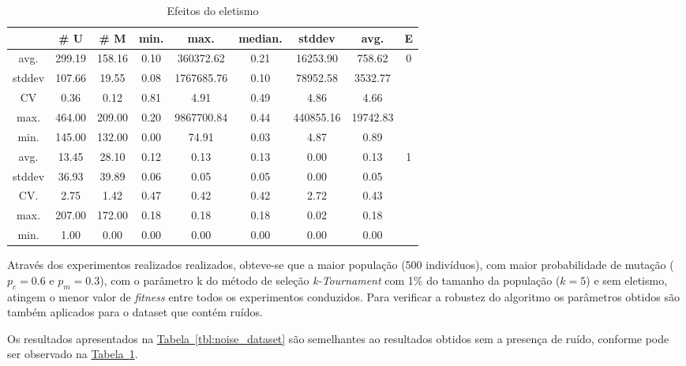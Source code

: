 \documentclass[a4paper]{paper}
\begin{document}
\begin{table}
  \center
  \caption{Efeitos do eletismo}
  \label{tbl:var_eletism}
  \begin{tabular}{| c | c | c | c | c | c | c | c | c |}
    \hline
    &  \# U & \# M & min. & max. & median. & stddev & avg. & E \\ \hline \hline
avg. & 299.19 & 158.16 & 0.10 & 360372.62 & 0.21 & 16253.90 & 758.62 & \multirow{5}{1.5cm}{0} \\ \cline{1-8}
stddev & 107.66 & 19.55 & 0.08 & 1767685.76 & 0.10 & 78952.58 & 3532.77 & \\ \cline{1-8}
CV & 0.36 & 0.12 & 0.81 & 4.91 & 0.49 & 4.86 & 4.66 & \\ \cline{1-8}
max. & 464.00 & 209.00 & 0.20 & 9867700.84 & 0.44 & 440855.16 & 19742.83 & \\ \cline{1-8}
min. & 145.00 & 132.00 & 0.00 & 74.91 & 0.03 & 4.87 & 0.89 & \\ \hline \hline
avg. & 13.45 & 28.10 & 0.12 & 0.13 & 0.13 & 0.00 & 0.13 & \multirow{5}{1.5cm}{1} \\ \cline{1-8}
stddev & 36.93 & 39.89 & 0.06 & 0.05 & 0.05 & 0.00 & 0.05 & \\ \cline{1-8}
CV. & 2.75 & 1.42 & 0.47 & 0.42 & 0.42 & 2.72 & 0.43 & \\ \cline{1-8}
max. & 207.00 & 172.00 & 0.18 & 0.18 & 0.18 & 0.02 & 0.18 & \\ \cline{1-8}
min. & 1.00 & 0.00 & 0.00 & 0.00 & 0.00 & 0.00 & 0.00 & \\ \hline 
  \end{tabular}
\end{table}

Através dos experimentos realizados realizados, obteve-se que a maior população
(500 indivíduos), com maior probabilidade de mutação ($p_c=0.6$ e $p_m=0.3$),
com o parâmetro k do método de seleção \textit{k-Tournament} com 1\% do tamanho
da população ($k=5$) e sem eletismo, atingem o menor valor de \textit{fitness}
entre todos os experimentos conduzidos. Para verificar a robustez do algoritmo
os parâmetros obtidos são também aplicados para o dataset que contém ruídos.

Os resultados apresentados na \hyperref[tbl:noise_dataset]{Tabela~\ref*{tbl:noise_dataset}}
são semelhantes ao resultados obtidos sem a presença de ruído, conforme pode ser
observado na \hyperref[tbl:var_eletism]{Tabela~\ref*{tbl:var_eletism}}.
\end{document}

